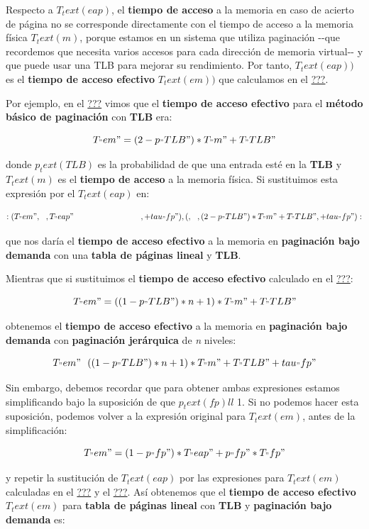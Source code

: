 Respecto a \(T_text(eap)\), el \textbf{tiempo de acceso} a la memoria en
caso de acierto de página no se corresponde directamente con el tiempo
de acceso a la memoria física \(T_text(m)\), porque estamos en un
sistema que utiliza paginación -\/-que recordemos que necesita varios
accesos para cada dirección de memoria virtual-\/- y que puede usar una
TLB para mejorar su rendimiento. Por tanto, \(T_text(eap))\) es el
\textbf{tiempo de acceso efectivo} \(T_text(em))\) que calculamos en el
\hyperref[paginaciuxf3n]{???}.

Por ejemplo, en el \hyperref[_tiempos_de_acceso_a_la_memoria]{???} vimos
que el \textbf{tiempo de acceso efectivo} para el \textbf{método básico
de paginación} con \textbf{TLB} era:

\[T_"em" = (2-p_"TLB")*T_"m" + T_"TLB"\]

donde \(p_text(TLB)\) es la probabilidad de que una entrada esté en la
\textbf{TLB} y \(T_text(m)\) es el \textbf{tiempo de acceso} a la
memoria física. Si sustituimos esta expresión por el \(T_text(eap)\) en:

\[{:(T_"em", ~~, T_"eap" \qquad\qquad\qquad\qquad\ ,+ tau_"fp"),
  (      , ~~, (2-p_"TLB")*T_"m" + T_"TLB" ,+ tau_"fp"):}\]

que nos daría el \textbf{tiempo de acceso efectivo} a la memoria en
\textbf{paginación bajo demanda} con una \textbf{tabla de páginas
lineal} y \textbf{TLB}.

Mientras que si sustituimos el \textbf{tiempo de acceso efectivo}
calculado en el \hyperref[_tiempos_de_acceso_a_la_memoria_2]{???}:

\[T_"em" = ((1-p_"TLB")*n+1)*T_"m" + T_"TLB"\]

obtenemos el \textbf{tiempo de acceso efectivo} a la memoria en
\textbf{paginación bajo demanda} con \textbf{paginación jerárquica} de
\emph{n} niveles:

\[T_"em" ~~ ((1-p_"TLB")*n+1)*T_"m" + T_"TLB" + tau_"fp"\]

Sin embargo, debemos recordar que para obtener ambas expresiones estamos
simplificando bajo la suposición de que \(p_text(fp) ll\) 1. Si no
podemos hacer esta suposición, podemos volver a la expresión original
para \(T_text(em)\), antes de la simplificación:

\[T_"em" = (1-p_"fp")*T_"eap" + p_"fp"*T_"fp"\]

y repetir la sustitución de \(T_text(eap)\) por las expresiones para
\(T_text(em)\) calculadas en el
\hyperref[_tiempos_de_acceso_a_la_memoria]{???} y el
\hyperref[_tiempos_de_acceso_a_la_memoria_2]{???}. Así obtenemos que el
\textbf{tiempo de acceso efectivo} \(T_text(em)\) para \textbf{tabla de
páginas lineal} con \textbf{TLB} y \textbf{paginación bajo demanda} es:

